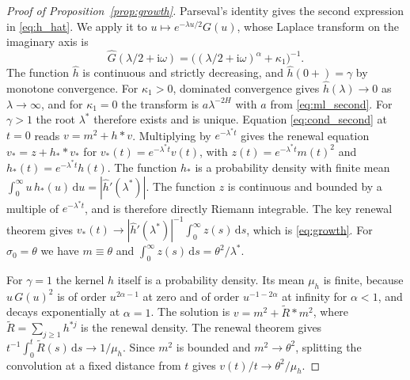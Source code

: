 \documentclass{rQUF2e}
\theoremstyle{plain}
\theoremstyle{definition}
\theoremstyle{remark}
\newcommand{\D}{\mathrm{d}}
\begin{document}
\begin{proof}[Proof of Proposition~\ref{prop:growth}] Parseval's identity gives the second expression in \eqref{eq:h_hat}. We apply it to $u\mapsto e^{-\lambda u/2}G(u)$, whose Laplace transform on the imaginary axis is
\begin{equation*}
\widehat G(\lambda/2+\mathrm{i}\omega)=\big((\lambda/2+\mathrm{i}\omega)^\alpha+\kappa_1\big)^{-1}.
\end{equation*}
The function $\widehat h$ is continuous and strictly decreasing, and $\widehat h(0+)=\gamma$ by monotone convergence. For $\kappa_1>0$, dominated convergence gives $\widehat h(\lambda)\to0$ as $\lambda\to\infty$, and for $\kappa_1=0$ the transform is $a\lambda^{-2H}$ with $a$ from \eqref{eq:ml_second}. For $\gamma>1$ the root $\lambda^*$ therefore exists and is unique. Equation \eqref{eq:cond_second} at $t=0$ reads $v=m^2+h*v$. Multiplying by $e^{-\lambda^*t}$ gives the renewal equation $v_\ast=z+h_\ast*v_\ast$ for $v_\ast(t)=e^{-\lambda^*t}v(t)$, with $z(t)=e^{-\lambda^*t}m(t)^2$ and $h_\ast(t)=e^{-\lambda^*t}h(t)$. The function $h_\ast$ is a probability density with finite mean $\int_0^\infty u\,h_\ast(u)\,\D u=|\widehat h'(\lambda^*)|$. The function $z$ is continuous and bounded by a multiple of $e^{-\lambda^*t}$, and is therefore directly Riemann integrable. The key renewal theorem \citep[Chapter~XI]{Feller1971} gives $v_\ast(t)\to|\widehat h'(\lambda^*)|^{-1}\int_0^\infty z(s)\,\D s$, which is \eqref{eq:growth}. For $\sigma_0=\theta$ we have $m\equiv\theta$ and $\int_0^\infty z(s)\,\D s=\theta^2/\lambda^*$.

For $\gamma=1$ the kernel $h$ itself is a probability density. Its mean $\mu_h$ is finite, because $u\,G(u)^2$ is of order $u^{2\alpha-1}$ at zero and of order $u^{-1-2\alpha}$ at infinity for $\alpha<1$, and decays exponentially at $\alpha=1$. The solution is $v=m^2+\widetilde R*m^2$, where $\widetilde R=\sum_{j\ge1}h^{*j}$ is the renewal density. The renewal theorem gives $t^{-1}\int_0^t\widetilde R(s)\,\D s\to1/\mu_h$. Since $m^2$ is bounded and $m^2\to\theta^2$, splitting the convolution at a fixed distance from $t$ gives $v(t)/t\to\theta^2/\mu_h$. \end{proof}
\end{document}
